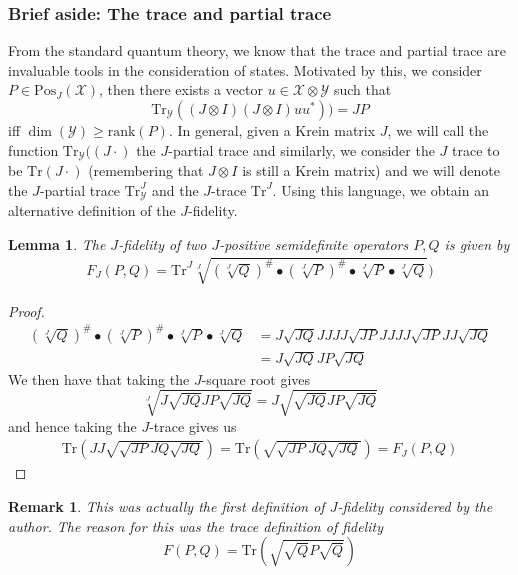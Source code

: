 \documentclass{amsart}
\numberwithin{equation}{section}
\newtheorem{lemma}[theorem]{Lemma}
\newtheorem{remark}[theorem]{Remark}
\theoremstyle{definition}
\theoremstyle{plain}
\theoremstyle{solutionstyle}
\begin{document}
\subsubsection{Brief aside: The trace and partial trace}
From the standard quantum theory, we know that the trace and partial trace are invaluable tools in the consideration of states. Motivated by this, we consider $P\in \mathrm{Pos}_J(\mathcal{X})$, then there exists a vector $u\in \mathcal{X}\otimes \mathcal{Y}$ such that \begin{equation*}\mathrm{Tr}_{\mathcal{Y}}((J\otimes I)(J\otimes I)uu^*))=JP\end{equation*} iff $\dim(\mathcal{Y})\geq \mathrm{rank}(P)$. In general, given a Krein matrix $J$, we will call the function $\mathrm{Tr}_{\mathcal{Y}}((J\cdot)$ the $J$-partial trace and similarly, we consider the $J$ trace to be $\mathrm{Tr}(J\cdot)$ (remembering that $J\otimes I$ is still a Krein matrix) and we will denote the $J$-partial trace $\mathrm{Tr}^J_{\mathcal{Y}}$ and the $J$-trace $\mathrm{Tr}^J$. Using this language, we obtain an alternative definition of the $J$-fidelity.
\begin{lemma}
    The $J$-fidelity of two $J$-positive semidefinite operators $P,Q$ is given by 
    \begin{align*}
        F_J(P,Q)=\mathrm{Tr}^J\sqrt[J]{(\sqrt[J]{Q})^{\#}\bullet(\sqrt[J]{P})^{\#}\bullet\sqrt[J]{P}\bullet\sqrt[J]{Q}})
    \end{align*}
\end{lemma}
\begin{proof}
    \begin{align*}(\sqrt[J]{Q})^{\#}\bullet(\sqrt[J]{P})^{\#}\bullet\sqrt[J]{P}\bullet\sqrt[J]{Q}   &=J\sqrt{JQ}JJJJ\sqrt{JP}JJJJ\sqrt{JP}JJ\sqrt{JQ}\\
    &=J\sqrt{JQ}JP\sqrt{JQ}
    \end{align*}
    We then have that taking the $J$-square root gives 
    \begin{equation*}\sqrt[J]{J\sqrt{JQ}JP\sqrt{JQ}}=J\sqrt{\sqrt{JQ}JP\sqrt{JQ}}\end{equation*}
     and hence taking the $J$-trace gives us 
    \begin{align*}
        \mathrm{Tr}\left(JJ\sqrt{\sqrt{JP}JQ\sqrt{JQ}}\right)=\mathrm{Tr}\left(\sqrt{\sqrt{JP}JQ\sqrt{JQ}}\right)=F_J(P,Q)
    \end{align*}
\end{proof}

\begin{remark}
    This was actually the first definition of $J$-fidelity considered by the author. The reason for this was the trace definition of fidelity \[F(P,Q)=\text{Tr}(\sqrt{\sqrt{Q}P\sqrt{Q}})\]
\end{remark}
\end{document}
